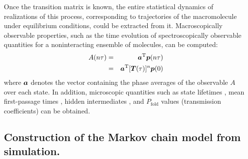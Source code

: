 Once the transition matrix is known, the entire statistical dynamics of realizations of this process, corresponding to trajectories of the macromolecule under equilibrium conditions, could be extracted from it.
Macroscopically observable properties, such as the time evolution of spectroscopically observable quantities for a noninteracting ensemble of molecules, can be computed:
\begin{eqnarray}
A(n\tau) &=& {\mbox{\boldmath{$a$}}}^{\mathrm{T}} {\mbox{\boldmath{$p$}}}(n\tau) \nonumber \\
&=& {\mbox{\boldmath{$a$}}}^{\mathrm{T}} [{\mbox{\boldmath{$T$}}}(\tau)]^n {\mbox{\boldmath{$p$}}}(0)
\end{eqnarray}
where ${\mbox{\boldmath{$a$}}}$ denotes the vector containing the phase averages of the observable $A$ over each state.
In addition, microscopic quantities such as state lifetimes \cite{swope:2004a}, mean first-passage times \cite{singhal:2004a}, hidden intermediates \cite{ozkan:2002a}, and $P_\mathrm{fold}$ values (transmission coefficients) \cite{lenz:2004a} can be obtained.

\subsection{Construction of the Markov chain model from simulation.}
\label{long-times:section:construction-of-markov-model-theory}

